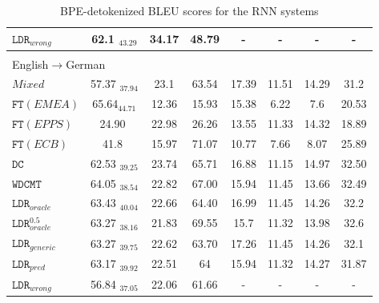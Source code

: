 \documentclass[11pt,a4paper]{article}
\begin{document}
\begin{table}[!h]
\begin{center}
{\begin{tabular}{|l|ccc|ccc||c|}
$\mathtt{LDR}_{wrong}$   & 62.1 $_{43.29}$ & 34.17 & 48.79 &  - & - & - & - \\
\hline
\multicolumn{8}{l}{} \\[-9pt]
\multicolumn{8}{l}{English$\rightarrow$German} \\
\hline
$Mixed$               & 57.37 $_{37.94}$ & 23.1 & 63.54 & 17.39 & 11.51 & 14.29 & 31.2\\
\hline
$\mathtt{FT} (EMEA)$  & 65.64$_{44.71}$ & 12.36 & 15.93 & 15.38 & 6.22 & 7.6  & 20.53\\
$\mathtt{FT} (EPPS)$   & 24.90 $ $ & 22.98 & 26.26 & 13.55 & 11.33 & 14.32 & 18.89 \\
$\mathtt{FT} (ECB)$    & 41.8 $ $ & 15.97 & 71.07 & 10.77 & 7.66 & 8.07 & 25.89\\
\hline
$\mathtt{DC}$                      & 62.53 $_{39.25}$ & 23.74 & 65.71 & 16.88 & 11.15 & 14.97 & 32.50\\
\hline
$\mathtt{WDCMT}$ & 64.05 $_{38.54}$ & 22.82 & 67.00 & 15.94 & 11.45 & 13.66 & 32.49\\
\hline
$\mathtt{LDR}_{oracle}$   & 63.43 $_{40.04}$ & 22.66 & 64.40 & 16.99 & 11.45 & 14.26 & 32.2\\
$\mathtt{LDR}_{oracle}^{0.5}$   & 63.27 $_{38.16}$ & 21.83 & 69.55 & 15.7 & 11.32 & 13.98 & 32.6\\
$\mathtt{LDR}_{generic}$ & 63.27 $_{39.75}$ & 22.62 & 63.70 & 17.26 & 11.45 & 14.26 & 32.1\\
$\mathtt{LDR}_{pred}$        & 63.17 $_{39.92}$ & 22.51 & 64 & 15.94 & 11.32 & 14.27 & 31.87\\
$\mathtt{LDR}_{wrong}$   & 56.84 $_{37.05}$ & 22.06 & 61.66 & - & - & - & - \\
\hline
\end{tabular}
} %
\end{center}
\caption{BPE-detokenized BLEU scores for the RNN systems\label{tab:results-rnn}}
\end{table}
\end{document}
